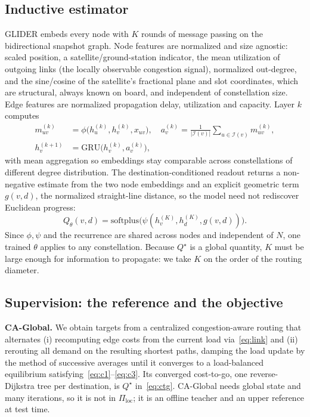 \documentclass[conference]{IEEEtran}
\begin{document}
\subsection{Inductive estimator}
GLIDER embeds every node with $K$ rounds of message passing on the bidirectional snapshot graph. Node features are normalized and size agnostic: scaled position, a satellite/ground-station indicator, the mean utilization of outgoing links (the locally observable congestion signal), normalized out-degree, and the sine/cosine of the satellite's fractional plane and slot coordinates, which are structural, always known on board, and independent of constellation size. Edge features are normalized propagation delay, utilization and capacity. Layer $k$ computes
\begin{align}
m^{(k)}_{uv}&=\phi\big(h^{(k)}_u,h^{(k)}_v,x_{uv}\big),\quad
a^{(k)}_v=\tfrac{1}{|\mathcal{I}(v)|}\!\!\sum_{u\in\mathcal{I}(v)}\!\! m^{(k)}_{uv},\nonumber\\
h^{(k+1)}_v&=\mathrm{GRU}\big(h^{(k)}_v,a^{(k)}_v\big),
\end{align}
with mean aggregation so embeddings stay comparable across constellations of different degree distribution. The destination-conditioned readout returns a non-negative estimate from the two node embeddings and an explicit geometric term $g(v,d)$, the normalized straight-line distance, so the model need not rediscover Euclidean progress:
\begin{equation}
Q_\theta(v,d)=\mathrm{softplus}\big(\psi(h^{(K)}_v,h^{(K)}_d,g(v,d))\big).
\end{equation}
Since $\phi,\psi$ and the recurrence are shared across nodes and independent of $N$, one trained $\theta$ applies to any constellation. Because $Q^\star$ is a global quantity, $K$ must be large enough for information to propagate: we take $K$ on the order of the routing diameter.

\subsection{Supervision: the reference and the objective}\label{sec:caglobal}
\textbf{CA-Global.} We obtain targets from a centralized congestion-aware routing that alternates (i) recomputing edge costs from the current load via~\eqref{eq:link} and (ii) rerouting all demand on the resulting shortest paths, damping the load update by the method of successive averages until it converges to a load-balanced equilibrium satisfying~\eqref{eq:c1}--\eqref{eq:c3}. Its converged cost-to-go, one reverse-Dijkstra tree per destination, is $Q^\star$ in~\eqref{eq:ctg}. CA-Global needs global state and many iterations, so it is not in $\Pi_{\mathrm{loc}}$; it is an offline teacher and an upper reference at test time.
\end{document}
